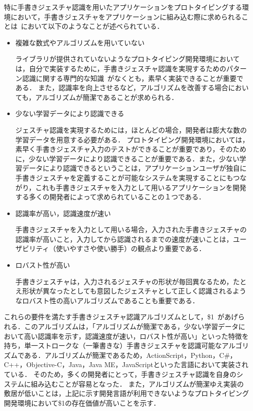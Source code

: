 特に手書きジェスチャ認識を用いたアプリケーションをプロトタイピングする環境において，手書きジェスチャをアプリケーションに組み込む際に求められることは~\cite{Rettig:1994:PTF:175276.175288}において以下のようなことが述べられている．
\begin{itemize}
 \item 複雑な数式やアルゴリズムを用いていない

ライブラリが提供されていないようなプロトタイピング開発環境においては，自分で実装するために，手書きジェスチャ認識を実現するためのパターン認識に関する専門的な知識~\cite{Hong00constructingfinite, Anderson2004HiddenMM,Sezgin:2005:HES:1040830.1040899, Cao:2005:EOA:1089508.1089540, Pittman:1991:RHT:108844.108914, Cho:2006:NGR:1711617.1711649,Rubine:1991:SGE:127719.122753, Anthony:2010:LMR:1839214.1839258}がなくとも，素早く実装できることが重要である．
また，認識率を向上させるなど，アルゴリズムを改善する場合においても，アルゴリズムが簡潔であることが求められる．

\item 少ない学習データにより認識できる

ジェスチャ認識を実現するためには，ほとんどの場合，開発者は膨大な数の学習データを用意する必要がある．
プロトタイピング開発環境においては，素早く手書きジェスチャ入力のテストができることが重要であり，そのために，少ない学習データにより認識できることが重要である．また，少ない学習データにより認識できるということは，アプリケーションユーザが独自に手書きジェスチャを定義することが可能なシステムを実現することにもつながり，これも手書きジェスチャを入力として用いるアプリケーションを開発する多くの開発者によって求められていることの１つである．

\item 認識率が高い，認識速度が速い

手書きジェスチャを入力として用いる場合，入力された手書きジェスチャの認識率が高いこと，入力してから認識されるまでの速度が速いことは，ユーザビリティ（使いやすさや使い勝手）の観点より重要である．

\item ロバスト性が高い

手書きジェスチャは，入力されるジェスチャの形状が毎回異なるため，たとえ形状が異なったとしても意図したジェスチャとして正しく認識されるようなロバスト性の高いアルゴリズムであることも重要である．
\end{itemize}

これらの要件を満たす手書きジェスチャ認識アルゴリズムとして，\$1~\cite{Wobbrock:2007:GWL:1294211.1294238}があげられる．このアルゴリズムは，「アルゴリズムが簡潔である，少ない学習データにおいて高い認識率を示す，認識速度が速い，ロバスト性が高い」といった特徴を持ち，単一ストロークな（一筆書きな）手書きジェスチャを認識可能なアルゴリズムである．アルゴリズムが簡潔であるため，ActionScript，Python，C\#，C++，Objective-C，Java，Java ME，JavaScriptといった言語において実装されている．
そのため，多くの開発者にとって，手書きジェスチャ認識を自身のシステムに組み込むことが容易となった．
また，アルゴリズムが簡潔ゆえ実装の敷居が低いことは，上記に示す開発言語が利用できないようなプロトタイピング開発環境において\$1の存在価値が高いことを示す．

